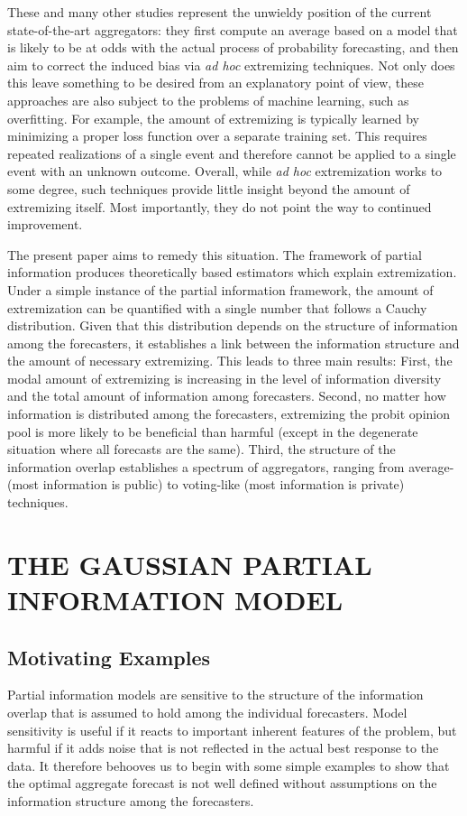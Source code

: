 \documentclass[12pt]{article}
\theoremstyle{definition}
\theoremstyle{definition}
\begin{document}
These and many other studies represent the unwieldy position of the
 current state-of-the-art aggregators: they first compute an average 
 based on a model that is
likely to be at odds with the actual process of probability
forecasting, and  then aim to correct the induced bias  via {\em ad hoc}
extremizing techniques.
%
Not only does this leave something to be desired from an explanatory
point of view, these approaches are also subject to the problems of
machine learning, such as overfitting.  For example, the amount of 
extremizing is typically learned by minimizing a
proper loss function over a separate training set. This requires repeated realizations
of a single event and therefore cannot be applied to a single event with an unknown outcome. Overall, while {\em ad hoc}
extremization works to some degree, such techniques provide little
insight beyond the amount of extremizing itself. Most importantly, they do not point
the way to continued improvement.

The present paper aims to remedy this situation.  The framework of
partial information produces theoretically based estimators which
explain extremization. Under a simple instance of the partial
information framework, the amount of extremization can be quantified
with a single number that follows a Cauchy distribution.  Given that
this distribution depends on the structure of information among the
forecasters, it establishes a link between the information structure
and the amount of necessary extremizing.  This leads to three main results:  First, the modal
amount of extremizing is increasing in the level of information
diversity and the total amount of information among forecasters.
Second, no matter how information is distributed among the forecasters,
extremizing the probit opinion pool is more likely to be beneficial
than harmful (except in the degenerate situation where all forecasts
are the same). Third, the structure of the information overlap establishes a spectrum of aggregators, ranging from
average- (most information is public) to voting-like (most information
is private) techniques.

\section{THE GAUSSIAN PARTIAL INFORMATION MODEL}
\label{sec:model}
\subsection{Motivating Examples}
Partial information models are sensitive to the structure of the
information overlap that is assumed to hold among the individual
forecasters. Model sensitivity is useful if it reacts
to important inherent features of the problem, but harmful if it adds
noise that is not reflected in the actual best response to the data.
It therefore behooves us to begin with some simple examples to show
that the optimal aggregate forecast is not well defined without
assumptions on the information structure among the forecasters.
\end{document}
